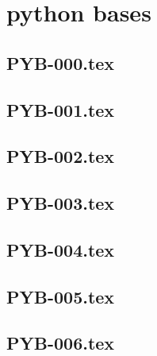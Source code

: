 \section*{python bases}
\renewcommand{\xxexo}{PYB-000.tex} 
\subsection*{\xxexo} 
\graphicspath{{../../exos/python_bases/PYB-000/}}
 
 
\renewcommand{\xxexo}{PYB-001.tex} 
\subsection*{\xxexo} 
\graphicspath{{../../exos/python_bases/PYB-001/}}
 
 
\renewcommand{\xxexo}{PYB-002.tex} 
\subsection*{\xxexo} 
\graphicspath{{../../exos/python_bases/PYB-002/}}
 
 
\renewcommand{\xxexo}{PYB-003.tex} 
\subsection*{\xxexo} 
\graphicspath{{../../exos/python_bases/PYB-003/}}
 
 
\renewcommand{\xxexo}{PYB-004.tex} 
\subsection*{\xxexo} 
\graphicspath{{../../exos/python_bases/PYB-004/}}
 
 
\renewcommand{\xxexo}{PYB-005.tex} 
\subsection*{\xxexo} 
\graphicspath{{../../exos/python_bases/PYB-005/}}
 
 
\renewcommand{\xxexo}{PYB-006.tex} 
\subsection*{\xxexo} 
\graphicspath{{../../exos/python_bases/PYB-006/}}
 
 
